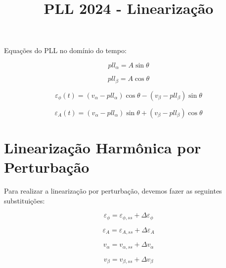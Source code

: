 \documentclass[12pt,a4paper]{report}
\title{PLL 2024 - Linearização}
\begin{document}
\maketitle



Equações do PLL no domínio do tempo:



\begin{equation}
pll_\alpha = A \sin \theta
\label{eq:pll:alpha}
\end{equation}

\begin{equation}
pll_\beta = A \cos \theta
\label{eq:pll:beta}
\end{equation}

\begin{equation}
\varepsilon_\phi(t)=
\left(
v_\alpha - pll_\alpha
\right)
\cos \theta -
\left(
v_\beta - pll_\beta
\right)
\sin \theta
\label{eq:erro:phi}
\end{equation}

\begin{equation}
\varepsilon_A(t)=
\left(
v_\alpha - pll_\alpha
\right)
\sin \theta +
\left(
v_\beta - pll_\beta
\right)
\cos \theta
\label{eq:erro:amp}
\end{equation}




\section{Linearização Harmônica por Perturbação}

Para realizar a linearização por perturbação, devemos fazer as seguintes substituições:

\begin{equation}
\varepsilon_\phi =
\varepsilon_{\phi,ss} + 
\Delta \varepsilon_\phi
\end{equation} 

\begin{equation}
\varepsilon_A =
\varepsilon_{A,ss} + 
\Delta \varepsilon_A
\end{equation} 


\begin{equation}
v_\alpha =
v_{\alpha,ss} + 
\Delta v_\alpha
\end{equation} 

\begin{equation}
v_\beta =
v_{\beta,ss} + 
\Delta v_\beta
\end{equation} 
\end{document}
